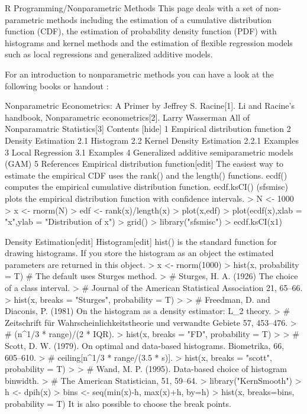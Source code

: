 R Programming/Nonparametric Methods
This page deals with a set of non-parametric methods including the estimation of a cumulative distribution function (CDF), the estimation of probability density function (PDF) with histograms and kernel methods and the estimation of flexible regression models such as local regressions and generalized additive models.

For an introduction to nonparametric methods you can have a look at the following books or handout :

Nonparametric Econometrics: A Primer by Jeffrey S. Racine[1].
Li and Racine's handbook, Nonparametric econometrics[2].
Larry Wasserman All of Nonparamatric Statistics[3]
Contents  [hide] 
1 Empirical distribution function
2 Density Estimation
2.1 Histogram
2.2 Kernel Density Estimation
2.2.1 Examples
3 Local Regression
3.1 Examples
4 Generalized additive semiparametric models (GAM)
5 References
Empirical distribution function[edit]
The easiest way to estimate the empirical CDF uses the rank() and the length() functions.
ecdf() computes the empirical cumulative distribution function.
ecdf.ksCI() (sfsmisc) plots the empirical distribution function with confidence intervals.
> N <- 1000
> x <- rnorm(N)
> edf <- rank(x)/length(x)
> plot(x,edf)
> plot(ecdf(x),xlab = "x",ylab = "Distribution of x")
> grid()
> library("sfsmisc")
> ecdf.ksCI(x1)


Density Estimation[edit]
Histogram[edit]
hist() is the standard function for drawing histograms. If you store the histogram as an object the estimated parameters are returned in this object.
> x <- rnorm(1000)
> hist(x, probability = T) # The default uses Sturges method.
> # Sturges, H. A. (1926) The choice of a class interval.
> # Journal of the American Statistical Association 21, 65–66. 
> hist(x, breaks = "Sturges", probability = T)
> 
> # Freedman, D. and Diaconis, P. (1981) On the histogram as a density estimator: L_2 theory.
> # Zeitschrift für Wahrscheinlichkeitstheorie und verwandte Gebiete 57, 453–476. 
> # (n^1/3 * range)/(2 * IQR).
> hist(x, breaks = "FD", probability = T)
> 
> # Scott, D. W. (1979). On optimal and data-based histograms. Biometrika, 66, 605–610. 
> # ceiling[n^1/3 * range/(3.5 * s)].
> hist(x, breaks = "scott", probability = T)
> 
> # Wand, M. P. (1995). Data-based choice of histogram binwidth.
> # The American Statistician, 51, 59–64. 
> library("KernSmooth")
> h <- dpih(x)
> bins <- seq(min(x)-h, max(x)+h, by=h)
> hist(x, breaks=bins, probability = T)
It is also possible to choose the break points.

